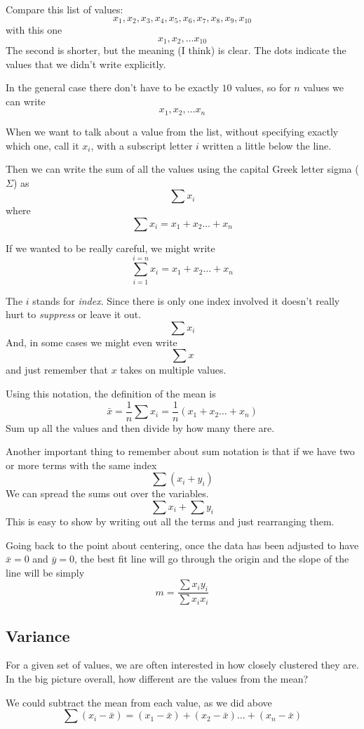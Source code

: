 \documentclass[11pt, oneside]{article}
\begin{document}
Compare this list of values:
\[ x_1, x_2, x_3, x_4, x_5, x_6, x_7, x_8, x_9, x_{10} \]
with this one
\[ x_1, x_2, \dots x_{10} \]
The second is shorter, but the meaning (I think) is clear.  The dots indicate the values that we didn't write explicitly.

In the general case there don't have to be exactly $10$ values, so for $n$ values we can write
\[ x_1, x_2, \dots x_n \]

When we want to talk about a value from the list, without specifying exactly which one, call it $x_i$, with a subscript letter $i$ written a little below the line.  

Then we can write the sum of all the values using the capital Greek letter sigma ($\Sigma$) as
\[ \sum x_i  \]
where
\[ \sum x_i = x_1 + x_2 \dots + x_n \]

If we wanted to be really careful, we might write
\[ \sum_{i=1}^{i=n}  x_i = x_1 + x_2 \dots + x_n \]

The $i$ stands for \emph{index}.  Since there is only one index involved it doesn't really hurt to \emph{suppress} or leave it out.
\[ \sum x_i  \]
And, in some cases we might even write
\[ \sum x  \]
and just remember that $x$ takes on multiple values.

Using this notation, the definition of the mean is
\[ \bar{x} = \frac{1}{n} \sum x_i  = \frac{1}{n}  (x_1 + x_2 \dots + x_n) \]
Sum up all the values and then divide by how many there are.

Another important thing to remember about sum notation is that if we have two or more terms with the same index
\[ \sum (x_i + y_i) \]
We can spread the sums out over the variables.
\[ \sum x_i + \sum y_i \]
This is easy to show by writing out all the terms and just rearranging them.

Going back to the point about centering, once the data has been adjusted to have $\bar{x} = 0$ and $\bar{y} = 0$, the best fit line will go through the origin and the slope of the line will be simply
\[ m = \frac{\sum x_i y_i}{\sum x_i x_i} \]

\subsection*{Variance}

For a given set of values, we are often interested in how closely clustered they are.  In the big picture overall, how different are the values from the mean?

We could subtract the mean from each value, as we did above
\[ \sum (x_i - \bar{x}) = (x_1 - \bar{x}) + (x_2 - \bar{x}) \dots + (x_n - \bar{x})  \]
\end{document}
